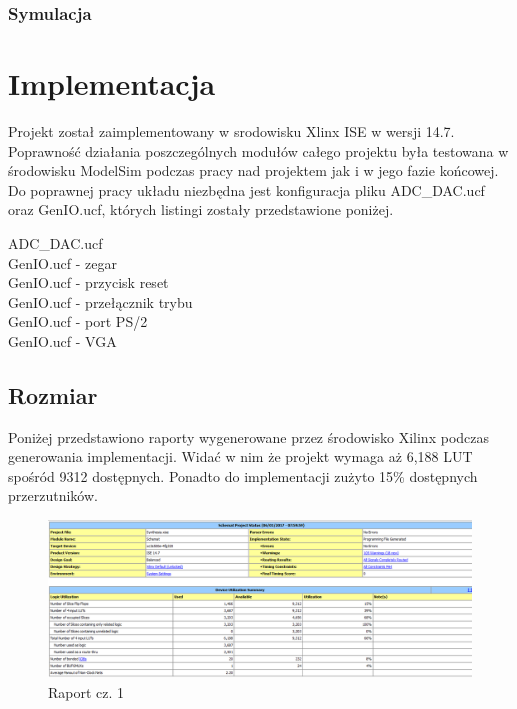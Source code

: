 \documentclass[a4paper]{report}
\begin{document}
		\subsection{Symulacja}
	
\chapter{Implementacja}
	Projekt został zaimplementowany w srodowisku Xlinx ISE w wersji 14.7. Poprawność działania poszczególnych
	modułów całego projektu była testowana w środowisku ModelSim podczas pracy nad projektem jak i w jego fazie końcowej.
	Do poprawnej pracy układu niezbędna jest konfiguracja pliku ADC\_DAC.ucf oraz GenIO.ucf, których listingi zostały przedstawione
	poniżej.
	
	ADC\_DAC.ucf \\
	
	
	GenIO.ucf - zegar \\
	
	
	GenIO.ucf - przycisk reset \\
	
	
	GenIO.ucf - przełącznik trybu \\
	
	
	GenIO.ucf - port PS/2 \\
	
	
	GenIO.ucf - VGA \\
	

	\section{Rozmiar}
	
	Poniżej przedstawiono raporty wygenerowane przez środowisko Xilinx podczas generowania implementacji.
	Widać w nim że projekt wymaga aż 6,188 LUT spośród 9312 dostępnych. Ponadto do implementacji
	zużyto 15\%  dostępnych przerzutników.
	
	\begin{figure}[h!]
				\centering
				\includegraphics[width=1.0\textwidth]{report1.png}
				\caption{Raport cz. 1}
	\end{figure}	
	
\end{document}
